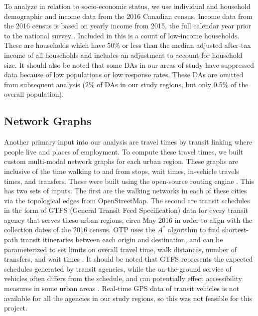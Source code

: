 \documentclass[11 pt, letterpaper]{article}
\begin{document}
{To analyze in relation to socio-economic status, we use individual and household demographic and income data from the 2016 Canadian census. Income data from the 2016 census is based on yearly income from 2015, the full calendar year prior to the national survey \cite{sc2016cdic}. Included in this is a count of low-income households. These are households which have 50\% or less than the median adjusted after-tax income of all households and includes an adjustment to account for household size. It should also be noted that some DAs in our areas of study have suppressed data because of low populations or low response rates. These DAs are omitted from subsequent analysis (2\% of DAs in our study regions, but only 0.5\% of the overall population). %





\subsection{Network Graphs}

Another primary input into our analysis are travel times by transit linking where people live and places of employment. To compute these travel times, we built custom multi-modal network graphs for each urban region. These graphs are inclusive of the time walking to and from stops, wait times, in-vehicle travels times, and transfers. These were built using the open-source routing engine . This has two sets of inputs. The first are the walking networks in each of these cities via the topological edges from OpenStreetMap. The second are transit schedules in the form of GTFS (General Transit Feed Specification) data for every transit agency that serves these urban regions, circa May 2016 in order to align with the collection dates of the 2016 census. OTP uses the $A^\text{*}$ algorithm to find shortest-path transit itineraries between each origin and destination, and can be parameterized to set limits on overall travel time, walk distances, number of transfers, and wait times \cite{otp}. It should be noted that GTFS represents the expected schedules generated by transit agencies, while the on-the-ground service of vehicles often differs from the schedule, and can potentially effect accessibility measures in some urban areas \cite{wessel2017}. Real-time GPS data of transit vehicles is not available for all the agencies in our study regions, so this was not feasible for this project.

}
\end{document}
